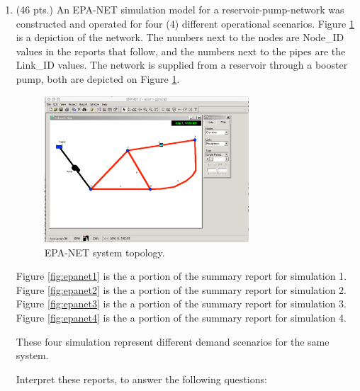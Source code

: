 \documentclass[11pt]{article}
\begin{document}
\begin{enumerate}
\clearpage
\item (46 pts.)
 An EPA-NET simulation model for a reservoir-pump-network was constructed and operated for four (4) different operational scenarios.   Figure \ref{fig:epa-net-map-gpm} is a depiction of the network.   The numbers next to the nodes are Node\_ID values in the reports that follow, and the numbers next to the pipes are the Link\_ID values.  The network is supplied from a reservoir through a booster pump, both are depicted on Figure \ref{fig:epa-net-map-gpm}. 

\begin{figure}[h!] %
\centering
   \includegraphics[width=3in]{epa-net-map-gpm.jpg}
   \caption{EPA-NET system topology.}
   \label{fig:epa-net-map-gpm} 
\end{figure}

Figure \ref{fig:epanet1} is the a portion of the summary report for simulation 1.   
Figure \ref{fig:epanet2} is the a portion of the summary report for simulation 2.  
Figure \ref{fig:epanet3} is the a portion of the summary report for simulation 3.  
Figure \ref{fig:epanet4} is the a portion of the summary report for simulation 4.

These four simulation represent different demand scenarios for the same system.



Interpret these reports, to answer the following questions:


\end{enumerate}
\end{document}
